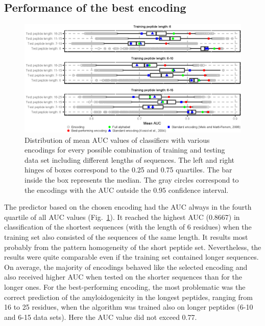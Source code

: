 \documentclass[fleqn,10pt,twoside]{gcb15submission}
\begin{document}
\subsection{Performance of the best encoding}

\begin{figure}[!tpb]
\centerline{\includegraphics{figures/AUC_boxplot.eps}}
\caption{Distribution of mean AUC values of classifiers with various encodings 
for every possible combination of training and testing data set including 
different lengths of sequences. The left and right hinges of boxes correspond to 
the 0.25 and 0.75 quartiles. The bar inside the box represents the median. The 
gray circles correspond to the encodings with the AUC outside the 0.95 
confidence interval. 
}\label{fig:AUC_boxplot} %
%
%
%
%
%


\end{figure}

The predictor based on the chosen encoding had the AUC always in the fourth 
quartile of all AUC values (Fig.~\ref{fig:AUC_boxplot}). It reached the highest AUC (0.8667) 
in classification of the shortest sequences (with the length of 6 residues) when 
the training set also consisted of the sequences of the same length. It results most 
probably from the pattern homogeneity of the short peptide set. Nevertheless, the results 
were quite comparable even if the training set contained longer sequences. On
average, the majority of encodings behaved like the selected encoding and also 
received higher AUC when tested on the shorter sequences than for the longer ones. 
For the best-performing encoding, the most problematic was the correct 
prediction of the amyloidogenicity in the longest peptides, ranging from 16 to 25 
residues, when the algorithm was trained also on longer peptides (6-10 and 6-15 
data sets). Here the AUC value did not exceed 0.77.
\end{document}
